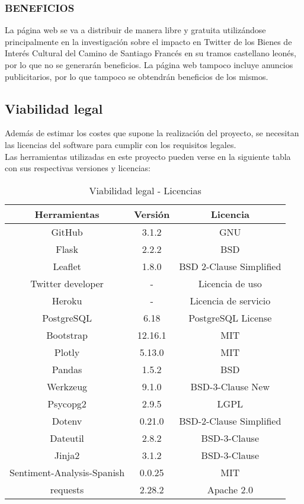 \subsubsection{BENEFICIOS}
La página web se va a distribuir de manera libre y gratuita utilizándose principalmente en la investigación sobre el impacto en Twitter de los Bienes de Interés Cultural del Camino de Santiago Francés en su tramos castellano leonés, por lo que no se generarán beneficios.
La página web tampoco incluye anuncios publicitarios, por lo que tampoco se obtendrán beneficios de los mismos.

\subsection{Viabilidad legal}
Además de estimar los costes que supone la realización del proyecto, se necesitan las licencias del software para cumplir con los requisitos legales.\\
Las herramientas utilizadas en este proyecto pueden verse en la siguiente tabla con sus respectivas versiones y licencias:

\begin{table}[ht!]
    \centering
    \begin{tabular}{c|c|c}
         \hline
         \textbf{Herramientas} & \textbf{Versión} &\textbf{Licencia} \\\hline
         {GitHub} &{3.1.2} &{GNU} \\\hline 
         {Flask} &{2.2.2} &{BSD} \\\hline
         {Leaflet} &{1.8.0} &{BSD 2-Clause Simplified} \\\hline
         {Twitter developer} &{-} &{Licencia de uso } \\\hline
         {Heroku} &{-} &{Licencia de servicio} \\\hline
         {PostgreSQL} &{6.18} &{PostgreSQL License} \\\hline 
         {Bootstrap} &{12.16.1} &{MIT} \\\hline 
         {Plotly} &{5.13.0} &{MIT} \\\hline
         {Pandas} &{1.5.2} &{BSD} \\\hline 
         {Werkzeug} &{9.1.0} &{BSD-3-Clause New} \\\hline
         {Psycopg2} &{2.9.5} &{LGPL} \\\hline 
         {Dotenv} &{0.21.0} &{BSD-2-Clause Simplified} \\\hline 
         {Dateutil} &{2.8.2} &{BSD-3-Clause} \\\hline 
         {Jinja2} &{3.1.2} &{BSD-3-Clause} \\\hline 
         {Sentiment-Analysis-Spanish} &{0.0.25} &{MIT} \\\hline 
         {requests} &{2.28.2} &{Apache 2.0} \\\hline 
    \end{tabular}    \caption{Viabilidad legal - Licencias}
    \label{tab:my_label}
\end{table}

